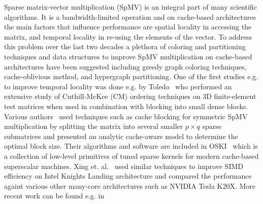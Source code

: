 


Sparse matrix-vector multiplication (SpMV) is an integral part of many scientific algorithms. It is a bandwidth-limited operation and on cache-based architectures the main factors that influence performance are spatial locality in accessing the matrix, and temporal locality in re-using the elements of the vector. To address this problem over the last two decades a plethora of coloring and partitioning techniques and data structures to improve SpMV multiplication on cache-based architectures have been suggested including greedy graph coloring techniques, cache-oblivious method, and hypergraph partitioning. One of the first studies e.g. to improve temporal locality was done e.g. by Toledo~\cite{Toledo:1997:IMP:279511.279532} who performed an extensive study of Cuthill-McKee (CM) ordering techniques on 3D finite-element test matrices when used in combination with blocking into small dense blocks. Various authors~\cite{Buluc:2011:RMA:2058524.2059503,Williams:2009:OSM:1513001.1513318,doi:10.1177/1094342004041296} used techniques such as cache blocking for symmetric SpMV multiplication by splitting the matrix into several smaller $p \times q$ sparse submatrices and presented an analytic cache-aware model to determine the optimal block size. Their algorithms and software are included in OSKI~\cite{1742-6596-16-1-071} which is a collection of low-level primitives of tuned sparse kernels for modern cache-based superscalar machines. Xing et. al.~\cite{Liu:2013:ESM:2464996.2465013} used similar techniques to improve SIMD efficiency on Intel Knights Landing architecture
and compared the performance againt various other many-core architectures such as NVIDIA Tesla K20X. More recent work can be found e.g. in~\cite{Buluc:2011:RMA:2058524.2059503,Liu:2015:CES:2751205.2751209}


